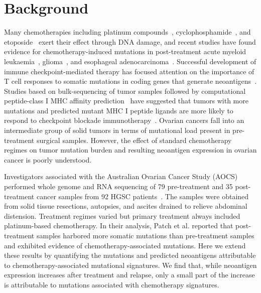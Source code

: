 \section*{Background}

Many chemotherapies including platinum compounds~\cite{Hannan_1989}, cyclophosphamide~\cite{Anderson_1995}, and etoposide~\cite{NAKANOMYO_1986} exert their effect through DNA damage, and recent studies have found evidence for chemotherapy-induced mutations in post-treatment acute myeloid leukaemia~\cite{Ding_2012}, glioma~\cite{Johnson_2013}, and esophageal adenocarcinoma~\cite{Murugaesu_2015}. Successful development of immune checkpoint-mediated therapy\cite{Chen_2013} has focused attention on the importance of T cell responses to somatic mutations in coding genes that generate neoantigens~\cite{Schumacher_2015}. Studies based on bulk-sequencing of tumor samples followed by computational peptide-class I MHC affinity prediction~\cite{Lundegaard_2007} have suggested that tumors with more mutations and predicted mutant MHC I peptide ligands are more likely to respond to checkpoint blockade immunotherapy~\cite{Van_Allen_2015,Rizvi_2015}. Ovarian cancers fall into an intermediate group of solid tumors in terms of mutational load present in pre-treatment surgical samples\cite{Lawrence_2013}. However, the effect of standard chemotherapy regimes on tumor mutation burden and resulting neoantigen expression in ovarian cancer is poorly understood.

Investigators associated with the Australian Ovarian Cancer Study (AOCS) performed whole genome and RNA sequencing of 79 pre-treatment and 35 post-treatment cancer samples from 92 HGSC patients~\cite{Patch_2015}. The samples were obtained from solid tissue resections, autopsies, and ascites drained to relieve abdominal distension. Treatment regimes varied but primary treatment always included platinum-based chemotherapy. In their analysis, Patch et al. reported that post-treatment samples harbored more somatic mutations than pre-treatment samples and exhibited evidence of chemotherapy-associated mutations. Here we extend these results by quantifying the mutations and predicted neoantigens attributable to chemotherapy-associated mutational signatures. We find that, while neoantigen expression increases after treatment and relapse, only a small part of the increase is attributable to mutations associated with chemotherapy signatures.



